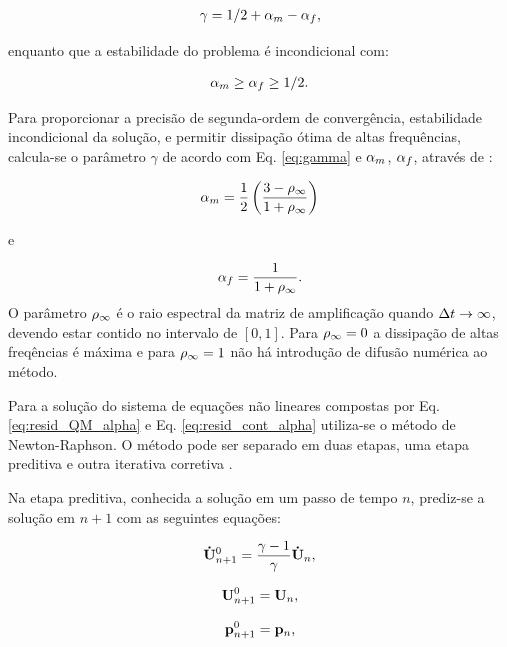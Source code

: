 \documentclass[tese_patricia]{subfiles}%
\begin{document}
\begin{gather}
\gamma = 1/2 + \alpha_m - \alpha_f,\label{eq:gamma}
\end{gather}

\noindent enquanto que a estabilidade do problema é incondicional com:

\begin{gather}
\alpha_m \ge \alpha_f \ge 1/2.
\end{gather}

Para proporcionar a precisão de segunda-ordem de convergência, estabilidade incondicional da solução, e permitir dissipação ótima de altas frequências, calcula-se o parâmetro $\gamma$ de acordo com Eq. \ref {eq:gamma} e $\alpha_m$, $\alpha_f$, através de \cite{Hughes:2000}:


\begin{gather}
\alpha_m = \frac{1}{2}\left(\frac{3 - \rho_\infty}{1+\rho_\infty}\right)\label{eq:alpha_m}\\
\end{gather}

\noindent e

\begin{gather}
\alpha_f = \frac{1}{1+\rho_\infty}\label{eq:alpha_f}.
\end{gather}
O parâmetro $\rho_\infty$ é o raio espectral da matriz de amplificação quando $\Delta t \rightarrow \infty$, devendo estar contido no intervalo de $[0,1]$. Para $\rho_\infty = 0$ a dissipação de altas freqências é máxima e para $\rho_\infty = 1$ não há introdução de difusão numérica ao método.

Para a solução do sistema de equações não lineares compostas por Eq. \eqref{eq:resid_QM_alpha} e Eq. \eqref{eq:resid_cont_alpha} utiliza-se o método de Newton-Raphson. O método pode ser separado em duas etapas, uma etapa preditiva e outra iterativa corretiva \cite{BazilevsTT:2013}.

Na etapa preditiva, conhecida a solução em um passo de tempo $n$, prediz-se a solução em $n+1$ com as seguintes equações:

\begin{align}
\mathbf{\dot{U}}_{n+1}^{0} = \frac{\gamma-1}{\gamma}\mathbf{\dot{U}}_{n} \label{eq:pred_acel},
\end{align}

\begin{align}
\mathbf{U}_{n+1}^{0} = \mathbf{U}_{n}, \label{eq:pred_vel}
\end{align}

\begin{align}
\mathbf{p}_{n+1}^{0} = \mathbf{p}_{n},\label{eq:pred_press}
\end{align}
\end{document}
